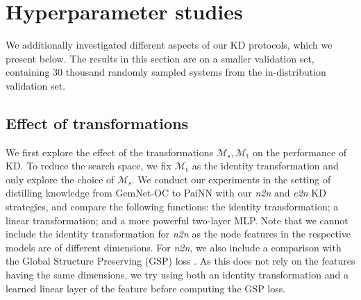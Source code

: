 \documentclass{article}
\begin{document}



\section{Hyperparameter studies}
\label{ap:hyperparams}
We additionally investigated different aspects of our KD protocols, which we present below. The results in this section are on a smaller validation set, containing 30 thousand randomly sampled systems from the in-distribution validation set.

\subsection{Effect of transformations} 
\label{ap:transformations}
We first explore the effect of the transformations $\mathcal{M}_\text{s}, \mathcal{M}_\text{t}$ on the performance of KD. To reduce the search space, we fix $\mathcal{M}_\text{t}$ as the identity transformation and only explore the choice of $\mathcal{M}_\text{s}$. We conduct our experiments in the setting of distilling knowledge from GemNet-OC to PaiNN with our \emph{n2n} and \emph{e2n} KD strategies, and compare the following functions: the identity transformation; a linear transformation; and a more powerful two-layer MLP. Note that we cannot include the identity transformation for \emph{n2n} as the node features in the respective models are of different dimensions. For \emph{n2n}, we also include a comparison with the Global Structure Preserving (GSP) loss \cite{joshi2022}. As this does not rely on the features having the same dimensions, we try using both an identity transformation and a learned linear layer of the feature before computing the GSP loss. 
\end{document}
